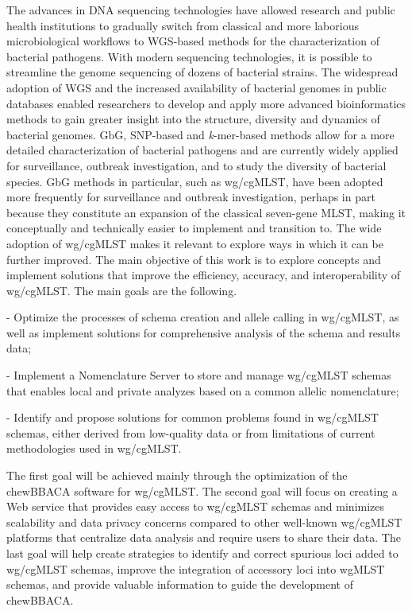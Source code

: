 The advances in \ac{DNA} sequencing technologies have allowed research and public health institutions to gradually switch from classical and more laborious microbiological workflows to \ac{WGS}-based methods for the characterization of bacterial pathogens. With modern sequencing technologies, it is possible to streamline the genome sequencing of dozens of bacterial strains. The widespread adoption of \ac{WGS} and the increased availability of bacterial genomes in public databases enabled researchers to develop and apply more advanced bioinformatics methods to gain greater insight into the structure, diversity and dynamics of bacterial genomes. \ac{GbG}, \ac{SNP}-based and \textit{k}-mer-based methods allow for a more detailed characterization of bacterial pathogens and are currently widely applied for surveillance, outbreak investigation, and to study the diversity of bacterial species. \ac{GbG} methods in particular, such as \ac{wg/cgMLST}, have been adopted more frequently for surveillance and outbreak investigation, perhaps in part because they constitute an expansion of the classical seven-gene \ac{MLST}, making it conceptually and technically easier to implement and transition to. The wide adoption of \ac{wg/cgMLST} makes it relevant to explore ways in which it can be further improved. The main objective of this work is to explore concepts and implement solutions that improve the efficiency, accuracy, and interoperability of \ac{wg/cgMLST}. The main goals are the following.

- Optimize the processes of schema creation and allele calling in \ac{wg/cgMLST}, as well as implement solutions for comprehensive analysis of the schema and results data;

- Implement a Nomenclature Server to store and manage \ac{wg/cgMLST} schemas that enables local and private analyzes based on a common allelic nomenclature;

- Identify and propose solutions for common problems found in \ac{wg/cgMLST} schemas, either derived from low-quality data or from limitations of current methodologies used in \ac{wg/cgMLST}.

The first goal will be achieved mainly through the optimization of the chewBBACA software for \ac{wg/cgMLST}. The second goal will focus on creating a Web service that provides easy access to \ac{wg/cgMLST} schemas and minimizes scalability and data privacy concerns compared to other well-known \ac{wg/cgMLST} platforms that centralize data analysis and require users to share their data. The last goal will help create strategies to identify and correct spurious loci added to \ac{wg/cgMLST} schemas, improve the integration of accessory loci into \ac{wgMLST} schemas, and provide valuable information to guide the development of chewBBACA.
